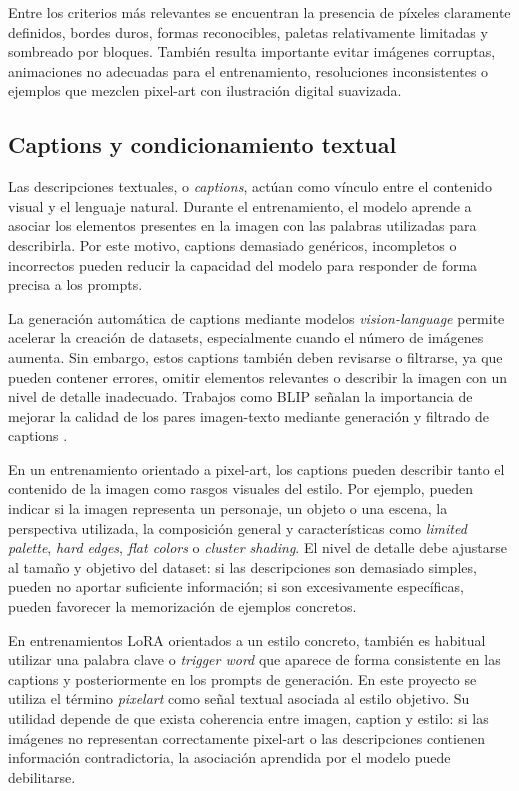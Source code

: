 \documentclass[a4paper,11pt,titlepage]{scrbook}
\begin{document}
\medskip

Entre los criterios más relevantes se encuentran la presencia de píxeles claramente definidos, bordes duros, formas reconocibles, paletas relativamente limitadas y sombreado por bloques. También resulta importante evitar imágenes corruptas, animaciones no adecuadas para el entrenamiento, resoluciones inconsistentes o ejemplos que mezclen pixel-art con ilustración digital suavizada.

\subsection{Captions y condicionamiento textual}

Las descripciones textuales, o \textit{captions}, actúan como vínculo entre el contenido visual y el lenguaje natural. Durante el entrenamiento, el modelo aprende a asociar los elementos presentes en la imagen con las palabras utilizadas para describirla. Por este motivo, captions demasiado genéricos, incompletos o incorrectos pueden reducir la capacidad del modelo para responder de forma precisa a los prompts.

\medskip

La generación automática de captions mediante modelos \textit{vision-language} permite acelerar la creación de datasets, especialmente cuando el número de imágenes aumenta. Sin embargo, estos captions también deben revisarse o filtrarse, ya que pueden contener errores, omitir elementos relevantes o describir la imagen con un nivel de detalle inadecuado. Trabajos como BLIP señalan la importancia de mejorar la calidad de los pares imagen-texto mediante generación y filtrado de captions \cite{li2022blip}.

\medskip

En un entrenamiento orientado a pixel-art, los captions pueden describir tanto el contenido de la imagen como rasgos visuales del estilo. Por ejemplo, pueden indicar si la imagen representa un personaje, un objeto o una escena, la perspectiva utilizada, la composición general y características como \textit{limited palette}, \textit{hard edges}, \textit{flat colors} o \textit{cluster shading}. El nivel de detalle debe ajustarse al tamaño y objetivo del dataset: si las descripciones son demasiado simples, pueden no aportar suficiente información; si son excesivamente específicas, pueden favorecer la memorización de ejemplos concretos.

\medskip

En entrenamientos LoRA orientados a un estilo concreto, también es habitual utilizar una palabra clave o \textit{trigger word} que aparece de forma consistente en las captions y posteriormente en los prompts de generación. En este proyecto se utiliza el término \textit{pixelart} como señal textual asociada al estilo objetivo. Su utilidad depende de que exista coherencia entre imagen, caption y estilo: si las imágenes no representan correctamente pixel-art o las descripciones contienen información contradictoria, la asociación aprendida por el modelo puede debilitarse.
\end{document}
